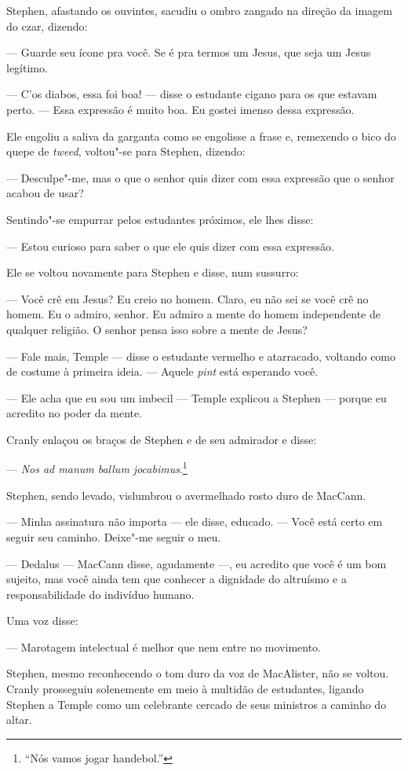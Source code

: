 Stephen, afastando os ouvintes, sacudiu o ombro zangado na direção da
imagem do czar, dizendo:

 --- Guarde seu ícone pra você. Se é pra termos um Jesus, que seja um Jesus
legítimo.

 --- C’os diabos, essa foi boa! --- disse o estudante cigano
para os que estavam perto. --- Essa expressão é muito boa. Eu gostei imenso
dessa expressão.

Ele engoliu a saliva da garganta como se engolisse a frase e, remexendo
o bico do quepe de \textit{tweed}, voltou"-se para Stephen, dizendo:

 --- Desculpe"-me, mas o que o senhor quis dizer com essa expressão que o senhor acabou de usar?

Sentindo"-se empurrar pelos estudantes próximos, ele lhes disse:

 --- Estou curioso para saber o que ele quis dizer com essa expressão.

Ele se voltou novamente para Stephen e disse, num sussurro:

 --- Você crê em Jesus? Eu creio no homem. Claro, eu não sei se você crê no
homem. Eu o admiro, senhor. Eu admiro a mente do homem independente
de qualquer religião. O senhor pensa isso sobre a mente de Jesus?

 --- Fale mais, Temple --- disse o estudante vermelho e atarracado, voltando
como de costume à primeira ideia. --- Aquele \textit{pint} está esperando
você.

 --- Ele acha que eu sou um imbecil --- Temple explicou a Stephen --- porque eu
acredito no poder da mente.

Cranly enlaçou os braços de Stephen e de seu admirador e disse:

 --- \textit{Nos ad manum ballum jocabimus}.\footnote{ “Nós vamos jogar
handebol.”}

Stephen, sendo levado, vislumbrou o avermelhado rosto duro de MacCann.

 --- Minha assinatura não importa --- ele disse, educado. --- Você está certo em
seguir seu caminho. Deixe"-me seguir o meu.

 --- Dedalus --- MacCann disse, agudamente ---, eu acredito que você é um bom
sujeito, mas você ainda tem que conhecer a dignidade do altruísmo e a
responsabilidade do indivíduo humano.

Uma voz disse:

 --- Marotagem intelectual é melhor que nem entre no movimento.

Stephen, mesmo reconhecendo o tom duro da voz de MacAlister, não se voltou.
Cranly prosseguiu solenemente em meio à multidão de
estudantes, ligando Stephen a Temple como um celebrante cercado de seus
ministros a caminho do altar.

